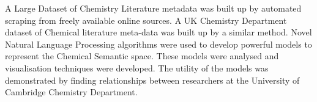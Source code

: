 A Large Dataset of Chemistry Literature metadata was built up by automated scraping from freely available online sources. A UK Chemistry Department dataset of Chemical literature meta-data was built up by a similar method. Novel Natural Language Processing algorithms were used to develop powerful models to represent the Chemical Semantic space. These models were analysed and visualisation techniques were developed. The utility of the models was demonstrated by finding relationships between researchers at the University of Cambridge Chemistry Department. 
